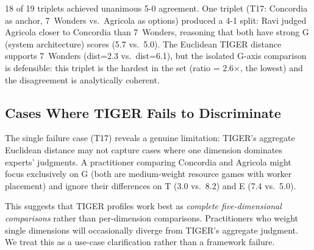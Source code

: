 18 of 19 triplets achieved unanimous 5-0 agreement.
One triplet (T17: Concordia as anchor, 7~Wonders vs.\ Agricola as options)
produced a 4-1 split: Ravi judged Agricola closer to Concordia than 7~Wonders,
reasoning that both have strong G (system architecture) scores (5.7 vs.\ 5.0).
The Euclidean TIGER distance supports 7~Wonders (dist=2.3 vs.\ dist=6.1),
but the isolated G-axis comparison is defensible: this triplet is the hardest
in the set (ratio = 2.6$\times$, the lowest) and the disagreement is
analytically coherent.

\subsection{Cases Where TIGER Fails to Discriminate}

The single failure case (T17) reveals a genuine limitation:
TIGER's aggregate Euclidean distance may not capture cases where one dimension
dominates experts' judgments. A practitioner comparing Concordia and Agricola
might focus exclusively on G (both are medium-weight resource games with worker
placement) and ignore their differences on T (3.0 vs.\ 8.2) and E (7.4 vs.\ 5.0).

This suggests that TIGER profiles work best as \emph{complete five-dimensional
comparisons} rather than per-dimension comparisons. Practitioners who weight
single dimensions will occasionally diverge from TIGER's aggregate judgment.
We treat this as a use-case clarification rather than a framework failure.
